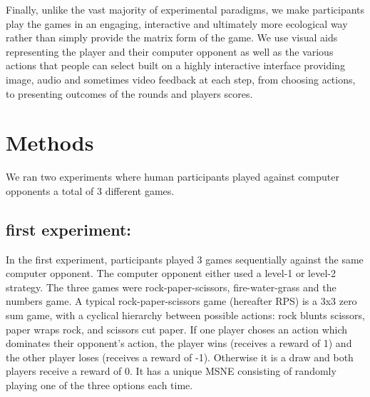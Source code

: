 \documentclass[man,floatsintext]{apa6}
\begin{document}
Finally, unlike the vast majority of experimental paradigms, we make participants play the games in an engaging, interactive and ultimately more ecological way rather than simply provide the matrix form of the game. We use visual aids representing the player and their computer opponent as well as the various actions that people can select built on a highly interactive interface providing image, audio and sometimes video feedback at each step, from choosing actions, to presenting outcomes of the rounds and players scores.

\newpage

\hypertarget{methods}{%
\section{Methods}\label{methods}}

We ran two experiments where human participants played against computer opponents a total of 3 different games.

\hypertarget{first-experiment}{%
\subsection{first experiment:}\label{first-experiment}}

In the first experiment, participants played 3 games sequentially against the same computer opponent. The computer opponent either used a level-1 or level-2 strategy. The three games were rock-paper-scissors, fire-water-grass and the numbers game. A typical rock-paper-scissors game (hereafter RPS) is a 3x3 zero sum game, with a cyclical hierarchy between possible actions: rock blunts scissors, paper wraps rock, and scissors cut paper. If one player choses an action which dominates their opponent's action, the player wins (receives a reward of 1) and the other player loses (receives a reward of -1). Otherwise it is a draw and both players receive a reward of 0. It has a unique MSNE consisting of randomly playing one of the three options each time.
\end{document}
